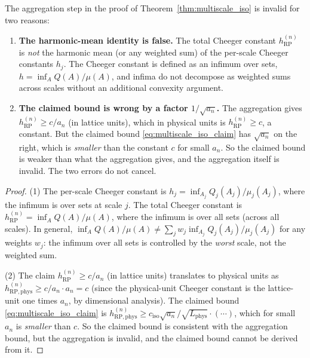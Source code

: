 \begin{theorem}
\label{thm:hw2}
The aggregation step in the proof of
Theorem~\ref{thm:multiscale_iso} is invalid for two reasons:
\begin{enumerate}
\item \textbf{The harmonic-mean identity is false.} The total
Cheeger constant $h_{\mathrm{RP}}^{(n)}$ is \emph{not} the
harmonic mean (or any weighted sum) of the per-scale Cheeger
constants $h_{j}$. The Cheeger constant is defined as an infimum
over sets, $h=\inf_{A}Q(A)/\mu(A)$, and infima do not decompose
as weighted sums across scales without an additional convexity
argument.
\item \textbf{The claimed bound is wrong by a factor
$1/\sqrt{a_{n}}$.} The aggregation gives
$h_{\mathrm{RP}}^{(n)}\ge c/a_{n}$ (in lattice units), which in
physical units is $h_{\mathrm{RP}}^{(n)}\ge c$, a constant. But
the claimed bound \eqref{eq:multiscale_iso_claim} has
$\sqrt{a_{n}}$ on the right, which is \emph{smaller} than the
constant $c$ for small $a_{n}$. So the claimed bound is weaker
than what the aggregation gives, and the aggregation itself is
invalid. The two errors do not cancel.
\end{enumerate}
\end{theorem}

\begin{proof}
(1) The per-scale Cheeger constant is
$h_{j}=\inf_{A_{j}}Q_{j}(A_{j})/\mu_{j}(A_{j})$, where the
infimum is over sets at scale $j$. The total Cheeger constant is
$h_{\mathrm{RP}}^{(n)}=\inf_{A}Q(A)/\mu(A)$, where the infimum is
over all sets (across all scales). In general,
$\inf_{A}Q(A)/\mu(A)\neq\sum_{j}w_{j}\inf_{A_{j}}Q_{j}(A_{j})/\mu
_{j}(A_{j})$ for any weights $w_{j}$: the infimum over all sets
is controlled by the \emph{worst} scale, not the weighted sum.

(2) The claim $h_{\mathrm{RP}}^{(n)}\ge c/a_{n}$ (in lattice
units) translates to physical units as
$h_{\mathrm{RP,phys}}^{(n)}\ge c/a_{n}\cdot a_{n}=c$ (since the
physical-unit Cheeger constant is the lattice-unit one times
$a_{n}$, by dimensional analysis). The claimed bound
\eqref{eq:multiscale_iso_claim} is
$h_{\mathrm{RP,phys}}^{(n)}\ge c_{\mathrm{iso}}\sqrt{a_{n}}/\sqrt
{L_{\mathrm{phys}}}\cdot(\cdots)$, which for small $a_{n}$ is
\emph{smaller} than $c$. So the claimed bound is consistent with
the aggregation bound, but the aggregation is invalid, and the
claimed bound cannot be derived from it.
\end{proof}

